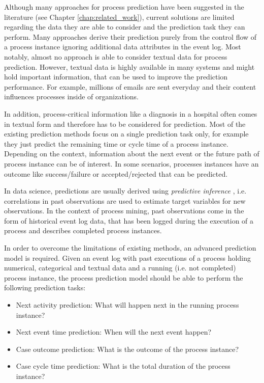Although many approaches for process prediction have been suggested in the literature (see Chapter \ref{chap:related_work}), current solutions are limited regarding the data they are able to consider and the prediction task they can perform.
Many approaches derive their prediction purely from the control flow of a process instance ignoring additional data attributes in the event log.
Most notably, almost no approach is able to consider textual data for process prediction.
However, textual data is highly available in many systems and might hold important information, that can be used to improve the prediction performance.
For example, millions of emails are sent everyday and their content influences processes inside of organizations.

In addition, process-critical information like a diagnosis in a hospital often comes in textual form and therefore has to be considered for prediction.
Most of the existing prediction methods focus on a single prediction task only, for example they just predict the remaining time or cycle time of a process instance.
Depending on the context, information about the next event or the future path of process instance can be of interest.
In some scenarios, processes instances have an outcome like success/failure or accepted/rejected that can be predicted.

In data science, predictions are usually derived using \textit{predictive inference} \cite{predinf}, i.e. correlations in past observations are used to estimate target variables for new observations.
In the context of process mining, past observations come in the form of historical event log data, that has been logged during the execution of a process and describes completed process instances.

In order to overcome the limitations of existing methods, an advanced prediction model is required.
Given an event log with past executions of a process holding numerical, categorical and textual data and a running (i.e. not completed) process instance, the process prediction model should be able to perform the following prediction tasks:

\begin{itemize}
	\item Next activity prediction: What will happen next in the running process instance?
	\item Next event time prediction: When will the next event happen?
	\item Case outcome prediction: What is the outcome of the process instance?
	\item Case cycle time prediction: What is the total duration of the process instance?
\end{itemize}

